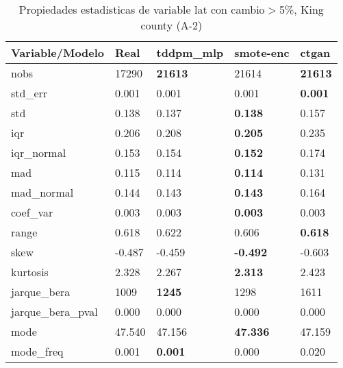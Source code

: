 \begin{table}[H]
\centering
\fontsize{8}{14}\selectfont
\caption{Propiedades estadisticas de variable lat con cambio\ensuremath{>}5\%, King county (A-2)}
\label{table-stats-king county-a-2-lat-short}
\begin{tabular}{|l|m{10em}|m{10em}|m{10em}|m{10em}|}
\hline
 \rowcolor[gray]{0.8}
Variable/Modelo & Real & tddpm\_mlp & smote-enc & ctgan \\
\hline nobs & 17290 & \bfseries 21613 & \cellcolor[rgb]{0.9, 0.54, 0.52} 21614 & \bfseries 21613 \\
\hline std\_err & 0.001 & \cellcolor[rgb]{0.9, 0.54, 0.52} 0.001 & 0.001 & \bfseries 0.001 \\
\hline std & 0.138 & 0.137 & \bfseries 0.138 & \cellcolor[rgb]{0.9, 0.54, 0.52} 0.157 \\
\hline iqr & 0.206 & 0.208 & \bfseries 0.205 & \cellcolor[rgb]{0.9, 0.54, 0.52} 0.235 \\
\hline iqr\_normal & 0.153 & 0.154 & \bfseries 0.152 & \cellcolor[rgb]{0.9, 0.54, 0.52} 0.174 \\
\hline mad & 0.115 & 0.114 & \bfseries 0.114 & \cellcolor[rgb]{0.9, 0.54, 0.52} 0.131 \\
\hline mad\_normal & 0.144 & 0.143 & \bfseries 0.143 & \cellcolor[rgb]{0.9, 0.54, 0.52} 0.164 \\
\hline coef\_var & 0.003 & 0.003 & \bfseries 0.003 & \cellcolor[rgb]{0.9, 0.54, 0.52} 0.003 \\
\hline range & 0.618 & 0.622 & \cellcolor[rgb]{0.9, 0.54, 0.52} 0.606 & \bfseries 0.618 \\
\hline skew & -0.487 & -0.459 & \bfseries -0.492 & \cellcolor[rgb]{0.9, 0.54, 0.52} -0.603 \\
\hline kurtosis & 2.328 & 2.267 & \bfseries 2.313 & \cellcolor[rgb]{0.9, 0.54, 0.52} 2.423 \\
\hline jarque\_bera & 1009 & \bfseries 1245 & 1298 & \cellcolor[rgb]{0.9, 0.54, 0.52} 1611 \\
\hline jarque\_bera\_pval & 0.000 & 0.000 & 0.000 & 0.000 \\
\hline mode & 47.540 & \cellcolor[rgb]{0.9, 0.54, 0.52} 47.156 & \bfseries 47.336 & 47.159 \\
\hline mode\_freq & 0.001 & \bfseries 0.001 & 0.000 & \cellcolor[rgb]{0.9, 0.54, 0.52} 0.020 \\
\hline
\end{tabular}
\end{table}
